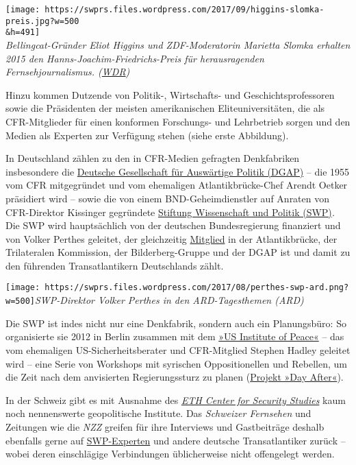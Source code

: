 \texttt{[image: https://swprs.files.wordpress.com/2017/09/higgins-slomka-preis.jpg?w=500\\\&h=491]}\\
\emph{Bellingcat-Gründer Eliot Higgins und ZDF-Moderatorin Marietta
Slomka erhalten 2015 den Hanns-Joachim-Friedrichs-Preis für
herausragenden Fernsehjournalismus.
(\href{https://presse.wdr.de/plounge/wdr/unternehmen/2015/10/20151028_hanns_joachim_friedrichs_preis.html}{WDR})}

Hinzu kommen Dutzende von Politik-, Wirtschafts- und
Geschichts­professoren sowie die Präsidenten der meisten amerikanischen
Elite­universitäten, die als CFR-Mitglieder für einen konformen
Forschungs- und Lehrbetrieb sorgen und den Medien als Experten zur
Verfügung stehen (siehe erste Abbildung).

In Deutschland zählen zu den in CFR-Medien gefragten Denkfabriken
insbesondere die \href{https://de.wikipedia.org/wiki/DGAP}{Deutsche
Gesellschaft für Auswärtige Politik (DGAP)} -- die 1955 vom CFR
mitgegründet und vom ehemaligen Atlantikbrücke-Chef Arendt Oetker
präsidiert wird -- sowie die von einem BND-Geheimdienstler auf Anraten
von CFR-Direktor Kissinger gegründete
\href{https://lobbypedia.de/wiki/Stiftung_Wissenschaft_und_Politik}{Stiftung
Wissenschaft und Politik (SWP)}\emph{.} Die SWP wird hauptsächlich von
der deutschen Bundes­regierung finanziert und von Volker Perthes
geleitet, der gleichzeitig
\href{https://spiegelkabinett-blog.blogspot.com/2014/05/stiftung-fur-wissenschaft-und-politik.html}{Mitglied}
in der Atlantikbrücke, der Trilateralen Kommission, der
Bilderberg-Gruppe und der DGAP ist und damit zu den führenden
Transatlantikern Deutschlands zählt.

\texttt{[image: https://swprs.files.wordpress.com/2017/08/perthes-swp-ard.png?w=500]}\emph{SWP-Direktor
Volker Perthes in den ARD-Tagesthemen (ARD)}

Die SWP ist indes nicht nur eine Denkfabrik, sondern auch ein
Planungsbüro: So organisierte sie 2012 in Berlin zusammen mit dem
\href{https://en.wikipedia.org/wiki/United_States_Institute_of_Peace}{»US
Institute of Peace«} -- das vom ehemaligen US-Sicherheitsberater und
CFR-Mitglied Stephen Hadley geleitet wird -- eine Serie von Workshops
mit syrischen Oppositionellen und Rebellen, um die Zeit nach dem
anvisierten Regierungssturz zu planen
(\href{http://www.zeit.de/2012/31/Syrien-Bundesregierung}{Projekt »Day
After«}).

In der Schweiz gibt es mit Ausnahme des
\href{http://www.css.ethz.ch/}{\emph{ETH Center for Security Studies}}
kaum noch nennenswerte geopolitische Institute. Das \emph{Schweizer
Fernsehen} und Zeitungen wie die \emph{NZZ} greifen für ihre Interviews
und Gastbeiträge deshalb ebenfalls gerne auf
\href{https://www.srf.ch/news/international/damaskus-ist-es-voellig-egal-wenn-viele-zivilisten-sterben}{SWP-Experten}
und andere deutsche Trans­atlantiker zurück -- wobei deren einschlägige
Verbindungen üblicherweise nicht offengelegt werden.

